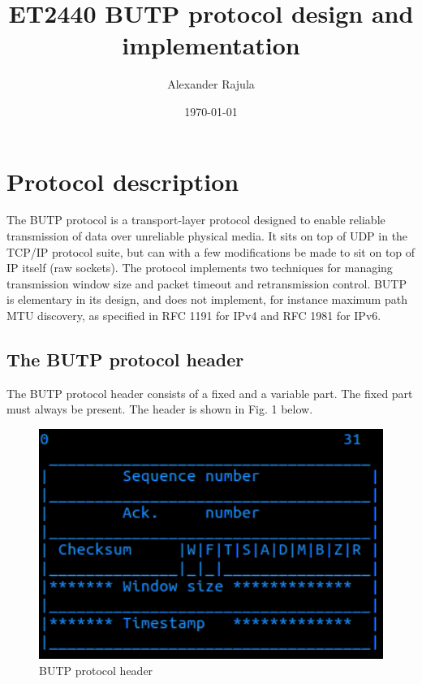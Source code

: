 \documentclass{article}
\begin{document}
\title{
	\huge{ET2440}
	\linebreak
	\linebreak
	BUTP protocol design and implementation
}
\date{\today}

\author{Alexander Rajula}

\maketitle

\newpage
\section{Protocol description}
The BUTP protocol is a transport-layer protocol designed to enable reliable transmission of data over unreliable physical media. It sits on top of UDP in the TCP/IP protocol suite, but can with a few modifications be made to sit on top of IP itself (raw sockets). The protocol implements two techniques for managing transmission window size and packet timeout and retransmission control. BUTP is elementary in its design, and does not implement, for instance maximum path MTU discovery, as specified in RFC 1191 for IPv4 and RFC 1981 for IPv6.

\subsection{The BUTP protocol header}
The BUTP protocol header consists of a fixed and a variable part. The fixed part must always be present. The header is shown in Fig. 1 below.

\begin{center}
        \begin{figure}[h!]
        \includegraphics[width=125mm]{butp_header.png}
        \caption{BUTP protocol header}
        \end{figure}
\end{center}
\end{document}
